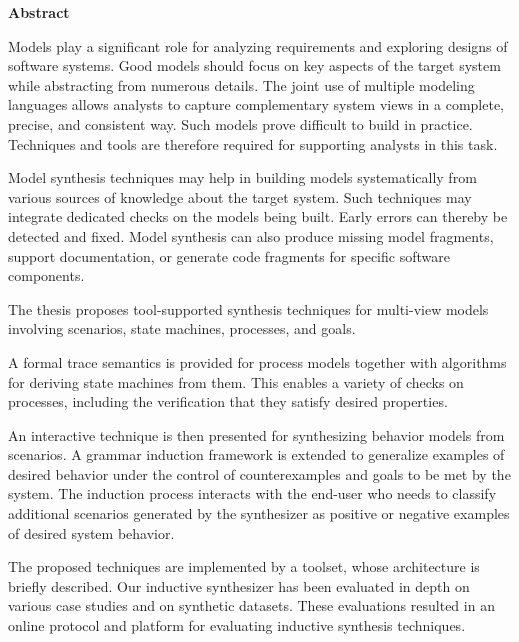 \begin{center}
\textbf{\large Abstract}
\end{center}

Models play a significant role for analyzing requirements and exploring designs of software systems. Good models should focus on key aspects of the target system while abstracting from numerous details. The joint use of multiple modeling languages allows analysts to capture complementary system views in a complete, precise, and consistent way. Such models prove difficult to build in practice. Techniques and tools are therefore required for supporting analysts in this task.

Model synthesis techniques may help in building models systematically from various sources of knowledge about the target system. Such techniques may integrate dedicated checks on the models being built. Early errors can thereby be detected and fixed. Model synthesis can also produce missing model fragments, support documentation, or generate code fragments for specific software components.

The thesis proposes tool-supported synthesis techniques for multi-view models involving scenarios, state machines, processes, and goals. 

A formal trace semantics is provided for process models together with algorithms for deriving state machines from them. This enables a variety of checks on processes, including the verification that they satisfy desired properties.

An interactive technique is then presented for synthesizing behavior models from scenarios. A grammar induction framework is extended to generalize examples of desired behavior under the control of counterexamples and goals to be met by the system. The induction process interacts with the end-user who needs to classify additional scenarios generated by the synthesizer as positive or negative examples of desired system behavior.

The proposed techniques are implemented by a toolset, whose architecture is briefly described. Our inductive synthesizer has been evaluated in depth on various case studies and on synthetic datasets. These evaluations resulted in an online protocol and platform for evaluating inductive synthesis techniques.
